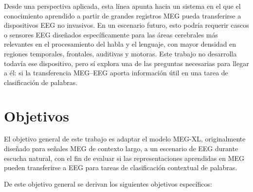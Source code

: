 Desde una perspectiva aplicada, esta línea apunta hacia un sistema en el que el conocimiento aprendido a partir de grandes registros MEG pueda transferirse a dispositivos EEG no invasivos. En un escenario futuro, esto podría requerir cascos o sensores EEG diseñados específicamente para las áreas cerebrales más relevantes en el procesamiento del habla y el lenguaje, con mayor densidad en regiones temporales, frontales, auditivas y motoras. Este trabajo no desarrolla todavía ese dispositivo, pero sí explora una de las preguntas necesarias para llegar a él: si la transferencia MEG--EEG aporta información útil en una tarea de clasificación de palabras.

\section{Objetivos}

El objetivo general de este trabajo es adaptar el modelo MEG-XL, originalmente diseñado para señales MEG de contexto largo, a un escenario de EEG durante escucha natural, con el fin de evaluar si las representaciones aprendidas en MEG pueden transferirse a EEG para tareas de clasificación contextual de palabras.

De este objetivo general se derivan los siguientes objetivos específicos:

